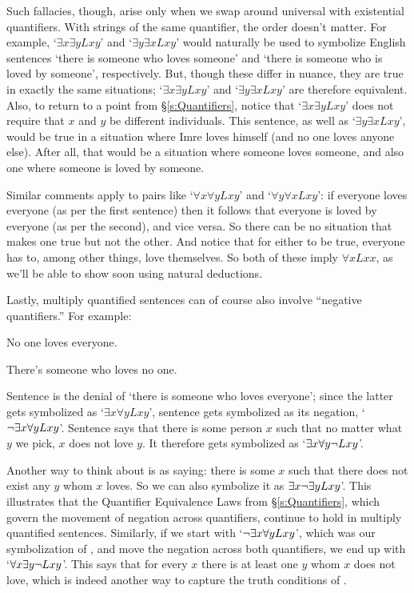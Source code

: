 Such fallacies, though, arise only when we swap around universal with existential quantifiers. With strings of the same quantifier, the order doesn't matter.  For example, `$\exists x \exists y Lxy$' and `$\exists y \exists x Lxy$' would naturally be used to symbolize English sentences `there is someone who loves someone' and `there is someone who is loved by someone', respectively. But, though these differ in nuance, they are true in exactly the same situations; `$\exists x \exists y Lxy$' and `$\exists y \exists x Lxy$' are therefore equivalent.  Also, to return to a point from \S\ref{s:Quantifiers}, notice that `$\exists x \exists y Lxy$' does not require that $x$ and $y$ be different individuals.  This sentence, as well as `$\exists y \exists x Lxy$',  would be true in a situation where Imre loves himself (and no one loves anyone else).  After all, that would be a situation where someone loves someone, and also one where someone is loved by someone.


 Similar comments apply to pairs like `$\forall x \forall y Lxy$' and `$\forall y \forall x Lxy$': if everyone loves everyone (as per the first sentence) then it follows that everyone is loved by everyone (as per the second), and vice versa.  So there can be no situation that makes one true but not the other.  And notice that for either to be true, everyone has to, among other things, love themselves.  So both of these imply $\forall xLxx$, as we'll be able to show soon using natural deductions.

 Lastly, multiply quantified sentences can of course also involve ``negative quantifiers.''  For example:

\begin{earg}
		\item[\ex{negquan1}] No one loves everyone.
		\item[\ex{negquan2}] There's someone who loves no one.
\end{earg}
Sentence  is the denial of `there is someone who loves everyone'; since the latter gets symbolized as `$\exists x\forall yLxy$', sentence  gets symbolized as its negation, `$\neg \exists x \forall y Lxy$'.  Sentence  says that there is some person $x$ such that  no matter what $y$ we pick, $x$ does not love $y$.  It therefore gets symbolized as `$\exists x \forall y \neg Lxy$'.

Another way to think about  is as saying: there is some  $x$ such that there does not exist any $y$ whom $x$ loves.  So we can also symbolize it as $\exists x \neg \exists y Lxy$'.  This illustrates that the Quantifier Equivalence Laws from \S\ref{s:Quantifiers}, which govern the movement of negation across quantifiers, continue to hold in multiply quantified sentences.  Similarly, if we start with `$\neg \exists x \forall y Lxy$', which was our symbolization of , and move the negation across both quantifiers, we end up with `$\forall x \exists y \neg Lxy$'.  This says that for every $x$ there is at least one $y$ whom $x$ does not love, which is indeed another way to capture the truth conditions of .


